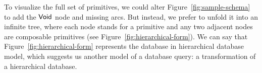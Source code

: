 To visualize the full set of primitives, we could alter
Figure~\ref{fig:sample-schema} to add the $\textup{\textsf{Void}}$ node and missing arcs.  But
instead, we prefer to unfold it into an infinite tree, where each node stands
for a primitive and any two adjacent nodes are composable primitives (see
Figure~\ref{fig:hierarchical-form}).  We can say that
Figure~\ref{fig:hierarchical-form} represents the database in hierarchical
database model, which suggests us another model of a database query: a
transformation of a hierarchical database.

